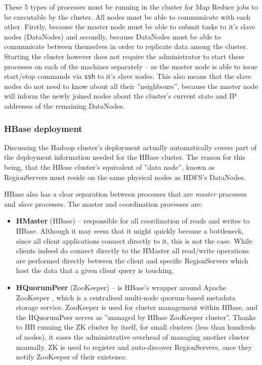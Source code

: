 These 5 types of processes must be running in the cluster for Map Reduce jobs to be executable by the cluster. All nodes must be able to communicate with each other. Firstly, because the master node must be able to submit tasks to it's slave nodes (DataNodes) and secondly, because DataNodes must be able to communicate between themselves in order to replicate data among the cluster. Starting the cluster however does not require the administrator to start these processes on each of the machines separately -- as the master node is able to issue start/stop commands via \verb|ssh| to it's slave nodes. This also means that the slave nodes do not need to know about all their ''neighbours'', because the master node will inform the newly joined nodes about the cluster's current state and IP addresses of the remaining DataNodes.


\subsubsection{HBase deployment}
\label{sec:hbase-deployment}
Discussing the Hadoop cluster's deployment actually automatically covers part of the deployment information needed for the HBase cluster. The reason for this being, that the HBase cluster's equivalent of ''data node'', known as RegionServers must reside on the same physical nodes as HDFS's DataNodes.

HBase also has a clear separation between processes that are \textit{master} processes and \textit{slave} processes.
The master and coordination processes are:

\begin{itemize}
\item \textbf{HMaster} (HBase) -- responsible for all coordination of reads and writes to HBase. Although it may seem 
                                  that it might quickly become a bottleneck, since all client applications connect 
                                  directly to it, this is not the case. While clients indeed do connect directly to the 
                                  HMaster all read/write operations are performed directly between the client and             
                                  specific RegionServers which host the data that a given client query is touching.
\item \textbf{HQuorumPeer} (ZooKeeper) -- is HBase's wrapper around Apache ZooKeeper \cite{zoo-keeper}, which is a
                                          centralised multi-node quorum-based metadata storage service. ZooKeeper is used 
                                          for cluster management within HBase, and the HQuorumPeer serves as ''managed by
                                          HBase ZooKeeper cluster''. Thanks to HB running the ZK cluster by itself, for 
                                          small clusters (less than hundreds of nodes), it eases the administrative 
                                          overhead of managing another cluster manually. ZK is used to register and 
                                          auto-discover RegionServers, once they notify ZooKeeper of their existence.
\end{itemize}

